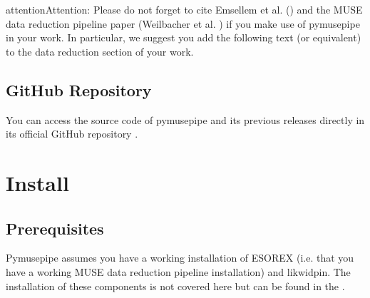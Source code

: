 \documentclass[letterpaper,10pt,english]{sphinxmanual}
\begin{document}
\begin{sphinxadmonition}{attention}{Attention:}
\sphinxAtStartPar
Please do not forget to cite Emsellem et al. ()
and the MUSE data reduction pipeline paper (Weilbacher et al. ) if you make use of pymusepipe in your work. In particular, we suggest you add the following text (or equivalent) to the data reduction section of your work.

\sphinxAtStartPar
{}
\end{sphinxadmonition}


\subsection{GitHub Repository}
\label{\detokenize{welcome:github-repository}}
\sphinxAtStartPar
You can access the source code of pymusepipe and its previous releases directly in its official GitHub repository .

\begin{DUlineblock}{0em}
\item[] 
\end{DUlineblock}

\sphinxstepscope


\section{Install}
\label{\detokenize{install:install}}\label{\detokenize{install::doc}}

\subsection{Prerequisites}
\label{\detokenize{install:prerequisites}}
\sphinxAtStartPar
Pymusepipe assumes you have a working installation of ESOREX (i.e. that you have a working
MUSE data reduction pipeline installation) and likwid\sphinxhyphen{}pin. The installation of these components is not covered here but can be found in the .
\end{document}
